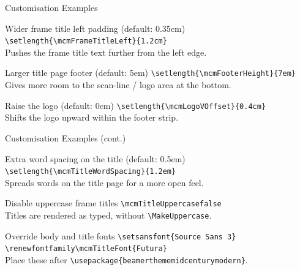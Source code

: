 \documentclass[aspectratio=169]{beamer}
\begin{document}
\begin{frame}{Customisation Examples}
  \begin{block}{Wider frame title left padding (default: 0.35cm)}
    \texttt{\textbackslash setlength\{\textbackslash mcmFrameTitleLeft\}\{1.2cm\}}\\
    {\small Pushes the frame title text further from the left edge.}
  \end{block}

  \begin{block}{Larger title page footer (default: 5em)}
    \texttt{\textbackslash setlength\{\textbackslash mcmFooterHeight\}\{7em\}}\\
    {\small Gives more room to the scan-line / logo area at the bottom.}
  \end{block}

  \begin{block}{Raise the logo (default: 0cm)}
    \texttt{\textbackslash setlength\{\textbackslash mcmLogoVOffset\}\{0.4cm\}}\\
    {\small Shifts the logo upward within the footer strip.}
  \end{block}
\end{frame}

\begin{frame}{Customisation Examples (cont.)}
  \begin{block}{Extra word spacing on the title (default: 0.5em)}
    \texttt{\textbackslash setlength\{\textbackslash mcmTitleWordSpacing\}\{1.2em\}}\\
    {\small Spreads words on the title page for a more open feel.}
  \end{block}

  \begin{block}{Disable uppercase frame titles}
    \texttt{\textbackslash mcmTitleUppercasefalse}\\
    {\small Titles are rendered as typed, without \texttt{\textbackslash MakeUppercase}.}
  \end{block}

  \begin{block}{Override body and title fonts}
    \texttt{\textbackslash setsansfont\{Source Sans 3\}}\\
    \texttt{\textbackslash renewfontfamily\textbackslash mcmTitleFont\{Futura\}}\\
    {\small Place these after \texttt{\textbackslash usepackage\{beamerthememidcenturymodern\}}.}
  \end{block}
\end{frame}
\end{document}
